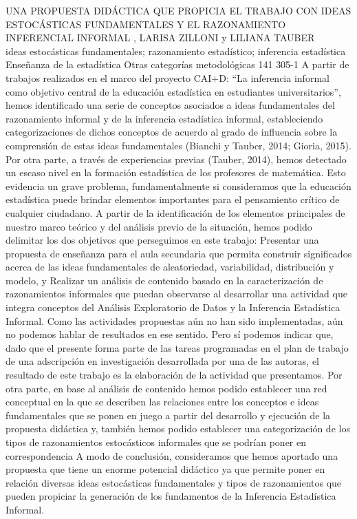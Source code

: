 \A
{UNA PROPUESTA DIDÁCTICA QUE PROPICIA EL TRABAJO CON IDEAS ESTOCÁSTICAS FUNDAMENTALES Y EL RAZONAMIENTO INFERENCIAL INFORMAL}
{, LARISA ZILLONI y LILIANA TAUBER}
{
\\}
{ideas estocásticas fundamentales; razonamiento estadístico; inferencia estadística} 
 {Enseñanza de la estadística} 
 {Otras categorías metodológicas} 
 {141} 
 {305-1}
{A partir de trabajos realizados en el marco del proyecto CAI+D: “La inferencia informal como objetivo central de la educación estadística en estudiantes universitarios”, hemos identificado una serie de conceptos asociados a ideas fundamentales del razonamiento informal y de la inferencia estadística informal, estableciendo categorizaciones de dichos conceptos de acuerdo al grado de influencia sobre la comprensión de estas ideas fundamentales (Bianchi y Tauber, 2014; Gioria, 2015). Por otra parte, a través de experiencias previas (Tauber, 2014), hemos detectado un escaso nivel en la formación estadística de los profesores de matemática. Esto evidencia un grave problema, fundamentalmente si consideramos que la educación estadística puede brindar elementos importantes para el pensamiento crítico de cualquier ciudadano. A partir de la identificación de los elementos principales de nuestro marco teórico y del análisis previo de la situación, hemos podido delimitar los dos objetivos que perseguimos en este trabajo: Presentar una propuesta de enseñanza para el aula secundaria que permita construir significados acerca de las ideas fundamentales de aleatoriedad, variabilidad, distribución y modelo, y Realizar un análisis de contenido basado en la caracterización de razonamientos informales que puedan observarse al desarrollar una actividad que integra conceptos del Análisis Exploratorio de Datos y la Inferencia Estadística Informal. Como las actividades propuestas aún no han sido implementadas, aún no podemos hablar de resultados en ese sentido. Pero sí podemos indicar que, dado que el presente forma parte de las tareas programadas en el plan de trabajo de una adscripción en investigación desarrollada por una de las autoras, el resultado de este trabajo es la elaboración de la actividad que presentamos. Por otra parte, en base al análisis de contenido hemos podido establecer una red conceptual en la que se describen las relaciones entre los conceptos e ideas fundamentales que se ponen en juego a partir del desarrollo y ejecución de la propuesta didáctica y, también hemos podido establecer una categorización de los tipos de razonamientos estocásticos informales que se podrían poner en correspondencia A modo de conclusión, consideramos que hemos aportado una propuesta que tiene un enorme potencial didáctico ya que permite poner en relación diversas ideas estocásticas fundamentales y tipos de razonamientos que pueden propiciar la generación de los fundamentos de la Inferencia Estadística Informal. }
